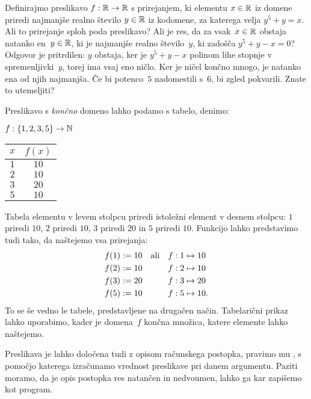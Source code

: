 \begin{zgled}
  \label{zgled:prirejanje-opis}
  Definirajmo preslikavo $f : \mathbb{R} \to \mathbb{R}$ s prirejanjem, ki elementu $x \in \mathbb{R}$ iz domene priredi najmanjše realno število $y \in \mathbb{R}$ iz kodomene, za katerega velja $y^5 + y = x$.
  Ali to prirejanje sploh poda preslikavo? Ali je res, da za vsak~$x \in \mathbb{R}$ obstaja natanko en~$y \in \mathbb{R}$, ki je najmanjše realno število~$y$, ki zadošča $y^5 + y - x = 0$? Odgovor je pritrdilen: $y$ obstaja, ker je $y^5 + y - x$ polinom lihe stopnje v spremenljivki~$y$, torej ima vsaj eno ničlo. Ker je ničel končno mnogo, je natanko ena od njih najmanjša.
  Če bi potenco~$5$ nadomestili s~$6$, bi zgled pokvarili. Znate to utemeljiti?
\end{zgled}

Preslikavo s \emph{končno} domeno lahko podamo s tabelo, denimo:
%
\begin{center}
  $f : \left\{1, 2, 3, 5\right\} \to \mathbb{N}$

  \medskip

  \begin{tabular}{cc}
    \toprule
    $x$ & $f(x)$ \\ \midrule
    $1$ & $10$ \\ 
    $2$ & $10$ \\ 
    $3$ & $20$ \\ 
    $5$ & $10$ \\ \bottomrule
  \end{tabular}
\end{center}
%
Tabela elementu v levem stolpcu priredi istoležni element v desnem stolpcu: $1$ priredi $10$, $2$ priredi $10$, $3$ priredi $20$ in $5$ priredi $10$. Funkcijo lahko predstavimo tudi tako, da naštejemo vsa prirejanja:
%
\begin{align*}
  f(1) &\mathrel{{:}{=}} 10    &&\text{ali}&    f : 1 &\mapsto 10 \\
  f(2) &\mathrel{{:}{=}} 10    &&&    f : 2 &\mapsto 10 \\
  f(3) &\mathrel{{:}{=}} 20    &&&    f : 3 &\mapsto 20 \\
  f(5) &\mathrel{{:}{=}} 10    &&&    f : 5 &\mapsto 10.
\end{align*}
%
To se še vedno le tabele, predstavljene na drugačen način.
%
Tabelarični prikaz lahko uporabimo, kader je domena~$f$ končna množica, katere elemente lahko naštejemo.

Preslikava je lahko določena tudi z opisom računskega postopka, pravimo mu ,
s pomočjo katerega izračunamo vrednost preslikave pri danem argumentu. Paziti moramo, da je
opis postopka res natančen in nedvoumen, lahko ga kar zapišemo kot program.


